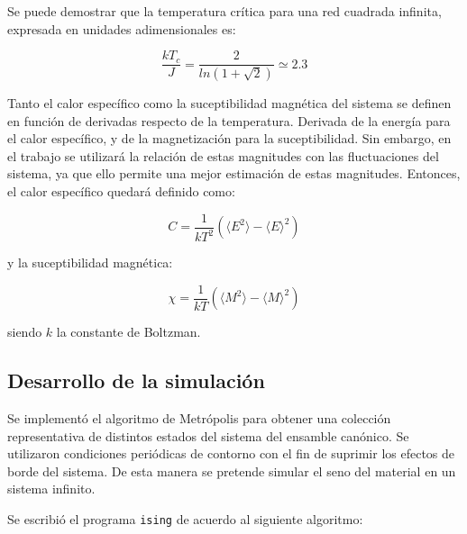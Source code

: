 \documentclass[a4paper,12pt]{article}
\begin{document}
Se puede demostrar \cite{chand1987} que la temperatura crítica para una red 
cuadrada infinita, expresada en unidades adimensionales es:

\begin{equation}
\frac{k T_c }{J} = \frac{2}{ln(1+\sqrt{2})} \simeq 2.3
\end{equation}

Tanto el calor específico como la suceptibilidad magnética del sistema se 
definen en función de derivadas respecto de la temperatura. Derivada de la 
energía para el calor específico, y de la magnetización para la suceptibilidad. 
Sin embargo, en el trabajo se utilizará la relación de estas magnitudes con las 
fluctuaciones del sistema, ya que ello permite una mejor estimación de estas 
magnitudes. Entonces, el calor específico quedará definido como:

\begin{equation}\label{eq:cal_teo}
C  = \frac{1}{kT^2} \left(\langle E^2\rangle - \langle E \rangle^2\right)
\end{equation}

\noindent y la suceptibilidad magnética:

\begin{equation}\label{eq:suce_teo}
\chi = \frac{1}{kT} \left(\langle M^2\rangle - \langle M \rangle^2\right)
\end{equation}

\noindent siendo $k$ la constante de Boltzman.

\subsection{Desarrollo de la simulación}

Se implementó el algoritmo de Metrópolis para obtener una colección 
representativa de distintos estados del sistema del ensamble canónico. Se 
utilizaron condiciones periódicas de contorno con el fin de suprimir los 
efectos de borde del sistema. De esta manera se pretende simular el seno del 
material en un sistema infinito.

Se escribió el programa \texttt{ising} de acuerdo al siguiente algoritmo:
\end{document}

